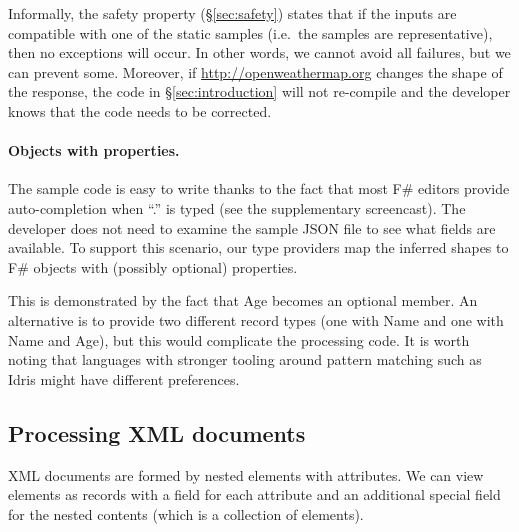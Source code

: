 \documentclass[10pt,nocopyrightspace]{sigplanconf}
\newcommand{\ident}[1]{\textnormal{\sffamily #1}}
\begin{document}
Informally, the safety property (\S\ref{sec:safety}) states that if the inputs are compatible
with one of the static samples (i.e.~the samples are representative), then no exceptions will
occur. In other words, we cannot avoid all failures, but we can prevent some. Moreover, if
\url{http://openweathermap.org} changes the shape of the response, the code in \S\ref{sec:introduction}
will not re-compile and the developer knows that the code needs to be corrected.

\paragraph{Objects with properties.}
The sample code is easy to write thanks to the fact that most F\# editors provide auto-completion
when ``.'' is typed (see the supplementary screencast). The developer does not need to examine the
sample JSON file to see what fields are available. To support this scenario, our type providers
map the inferred shapes to F\# objects with (possibly optional) properties.

This is demonstrated by the fact that \ident{Age} becomes an optional member.
An alternative is to provide two different record types (one with \ident{Name} and one with
\ident{Name} and \ident{Age}), but this would complicate the processing code.
It is worth noting that languages with stronger tooling around pattern matching
such as Idris \cite{idris-tools} might have different preferences.


\subsection{Processing XML documents}
\label{sec:providers-xml}

XML documents are formed by nested elements with attributes. We can view elements as records with
a field for each attribute and an additional special field for the nested contents (which is a
collection of elements).
\end{document}
